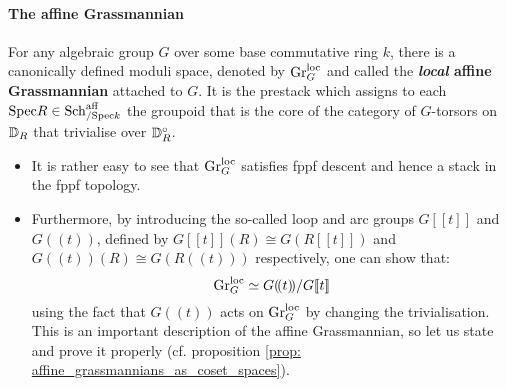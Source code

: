                \paragraph{The affine Grassmannian}
                    \begin{definition} \label{def: local_affine_grassmannians}
                        For any algebraic group $G$ over some base commutative ring $k$, there is a canonically defined moduli space, denoted by $\mathrm{Gr}_G^{\mathrm{loc}}$ and called the \textbf{\textit{local} affine Grassmannian} attached to $G$. It is the prestack which assigns to each $\mathrm{Spec} R \in \mathrm{Sch}_{/\mathrm{Spec} k}^{\mathrm{aff}}$ the groupoid that is the core of the category of $G$-torsors on $\mathbb{D}_R$ that trivialise over $\mathbb{D}_R^{\circ}$.  
                    \end{definition}
                    \begin{remark}
                        \noindent
                        \begin{itemize}
                            \item It is rather easy to see that $\mathrm{Gr}_G^{\mathrm{loc}}$ satisfies fppf descent and hence a stack in the fppf topology.
                            \item Furthermore, by introducing the so-called loop and arc groups $G[\![t]\!]$ and $G(\!(t)\!)$, defined by $G[\![t]\!](R) \cong G(R[\![t]\!])$ and $G(\!(t)\!)(R) \cong G(R(\!(t)\!))$ respectively, one can show that:
                                $$\mathrm{Gr}_G^{\mathrm{loc}} \simeq G(\!(t)\!)/G[\![t]\!]$$
                            using the fact that $G(\!(t)\!)$ acts on $\mathrm{Gr}_G^{\mathrm{loc}}$ by changing the trivialisation. This is an important description of the affine Grassmannian, so let us state and prove it properly (cf. proposition \ref{prop: affine_grassmannians_as_coset_spaces}).
                        \end{itemize}
                    \end{remark}
                    
